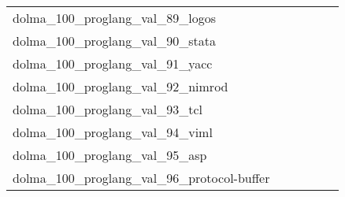 {\begin{longtable}{m{6cm}m{1.7cm}m{1.7cm}m{1.7cm}m{1.7cm}m{1.7cm}}
	dolma\_100\_proglang\_val\_89\_logos  & \colorbox[HTML]{77c578}{\makebox[\mywidth][c]{2.37}} & \colorbox[HTML]{fbfdd0}{\makebox[\mywidth][c]{2.58}} & \colorbox[HTML]{ffffe5}{\makebox[\mywidth][c]{2.98}} & \colorbox[HTML]{def2a6}{\makebox[\mywidth][c]{2.46}} & \colorbox[HTML]{d1ec9f}{\makebox[\mywidth][c]{2.44}}\\
	dolma\_100\_proglang\_val\_90\_stata  & \colorbox[HTML]{77c578}{\makebox[\mywidth][c]{4.67}} & \colorbox[HTML]{ebf7b0}{\makebox[\mywidth][c]{5.08}} & \colorbox[HTML]{ffffe5}{\makebox[\mywidth][c]{6.85}} & \colorbox[HTML]{c1e597}{\makebox[\mywidth][c]{4.85}} & \colorbox[HTML]{b3df91}{\makebox[\mywidth][c]{4.81}}\\
	dolma\_100\_proglang\_val\_91\_yacc  & \colorbox[HTML]{77c578}{\makebox[\mywidth][c]{2.42}} & \colorbox[HTML]{d3eda0}{\makebox[\mywidth][c]{2.48}} & \colorbox[HTML]{ffffe5}{\makebox[\mywidth][c]{2.87}} & \colorbox[HTML]{91d183}{\makebox[\mywidth][c]{2.44}} & \colorbox[HTML]{84cb7d}{\makebox[\mywidth][c]{2.43}}\\
	dolma\_100\_proglang\_val\_92\_nimrod  & \colorbox[HTML]{77c578}{\makebox[\mywidth][c]{2.75}} & \colorbox[HTML]{d9f0a3}{\makebox[\mywidth][c]{2.87}} & \colorbox[HTML]{ffffe5}{\makebox[\mywidth][c]{3.63}} & \colorbox[HTML]{b0de8f}{\makebox[\mywidth][c]{2.81}} & \colorbox[HTML]{8ccf81}{\makebox[\mywidth][c]{2.77}}\\
	dolma\_100\_proglang\_val\_93\_tcl  & \colorbox[HTML]{77c578}{\makebox[\mywidth][c]{3.00}} & \colorbox[HTML]{e7f5ad}{\makebox[\mywidth][c]{3.16}} & \colorbox[HTML]{ffffe5}{\makebox[\mywidth][c]{3.95}} & \colorbox[HTML]{b8e293}{\makebox[\mywidth][c]{3.07}} & \colorbox[HTML]{95d284}{\makebox[\mywidth][c]{3.02}}\\
	dolma\_100\_proglang\_val\_94\_viml  & \colorbox[HTML]{7cc77a}{\makebox[\mywidth][c]{5.56}} & \colorbox[HTML]{d8efa2}{\makebox[\mywidth][c]{5.76}} & \colorbox[HTML]{ffffe5}{\makebox[\mywidth][c]{7.21}} & \colorbox[HTML]{91d183}{\makebox[\mywidth][c]{5.59}} & \colorbox[HTML]{77c578}{\makebox[\mywidth][c]{5.55}}\\
	dolma\_100\_proglang\_val\_95\_asp  & \colorbox[HTML]{d9f0a3}{\makebox[\mywidth][c]{1.79}} & \colorbox[HTML]{dcf1a5}{\makebox[\mywidth][c]{1.79}} & \colorbox[HTML]{ffffe5}{\makebox[\mywidth][c]{1.90}} & \colorbox[HTML]{77c578}{\makebox[\mywidth][c]{1.77}} & \colorbox[HTML]{84cb7d}{\makebox[\mywidth][c]{1.77}}\\
	dolma\_100\_proglang\_val\_96\_protocol-buffer  & \colorbox[HTML]{d9f0a3}{\makebox[\mywidth][c]{1.32}} & \colorbox[HTML]{7dc87b}{\makebox[\mywidth][c]{1.31}} & \colorbox[HTML]{ffffe5}{\makebox[\mywidth][c]{1.38}} & \colorbox[HTML]{77c578}{\makebox[\mywidth][c]{1.31}} & \colorbox[HTML]{a0d789}{\makebox[\mywidth][c]{1.32}}\\

\end{longtable}}
